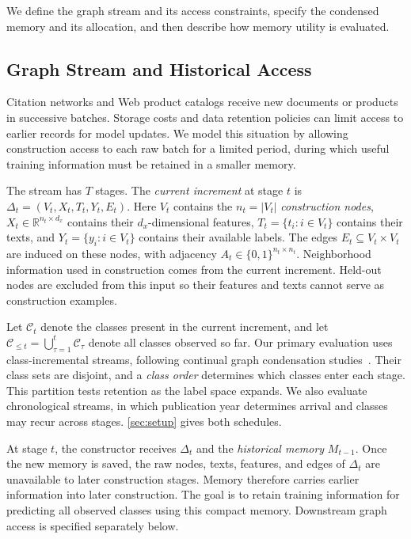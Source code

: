 We define the graph stream and its access constraints, specify the condensed
memory and its allocation, and then describe how memory utility is evaluated.

\subsection{Graph Stream and Historical Access}
\label{sec:stream_setting}

Citation networks and Web product catalogs receive new documents or products
in successive batches. Storage costs and data retention policies can limit
access to earlier records for model updates. We model this situation by
allowing construction access to each raw batch for a limited period, during
which useful training information must be retained in a smaller memory.

The stream has $T$ stages. The \emph{current increment} at stage $t$ is
$\Delta_t=(V_t,X_t,T_t,Y_t,E_t)$. Here $V_t$ contains the $n_t=|V_t|$
\emph{construction nodes}, $X_t\in\mathbb R^{n_t\times d_x}$ contains their
$d_x$-dimensional features, $T_t=\{t_i:i\in V_t\}$ contains their texts,
and $Y_t=\{y_i:i\in V_t\}$ contains their available labels. The edges
$E_t\subseteq V_t\times V_t$ are induced on these nodes, with adjacency
$A_t\in\{0,1\}^{n_t\times n_t}$. Neighborhood information used in
construction comes from the current increment. Held-out nodes are excluded from this input so their
features and texts cannot serve as construction examples.

Let $\mathcal C_t$ denote the classes present in the current increment, and let
$\mathcal C_{\leq t}=\bigcup_{\tau=1}^t\mathcal C_\tau$ denote all
classes observed so far. Our primary evaluation uses class-incremental streams,
following continual graph condensation studies~\cite{cat,puma}. Their class sets
are disjoint, and a \emph{class order} determines which classes enter each stage.
This partition tests retention as the label space expands. We also evaluate
chronological streams, in which publication year determines arrival and
classes may recur across stages. \autoref{sec:setup} gives both schedules.

At stage $t$, the constructor receives $\Delta_t$ and the
\emph{historical memory} $M_{t-1}$. Once the new memory is saved, the raw
nodes, texts, features, and edges of $\Delta_t$ are unavailable to later
construction stages. Memory therefore carries earlier information into later
construction. The goal is to retain training information for predicting all
observed classes using this compact memory. Downstream graph access is
specified separately below.

